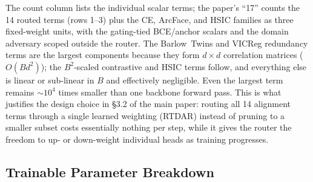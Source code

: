 The count column lists the individual scalar terms; the paper's ``17'' counts the 14 routed terms (rows 1--3) plus the CE, ArcFace, and HSIC families as three fixed-weight units, with the gating-tied BCE/anchor scalars and the domain adversary scoped outside the router.
The Barlow~Twins and VICReg redundancy terms are the largest components because they form $d{\times}d$ correlation matrices ($O(Bd^2)$); the $B^2$-scaled contrastive and HSIC terms follow, and everything else is linear or sub-linear in $B$ and effectively negligible.
Even the largest term remains ${\sim}10^{4}$ times smaller than one backbone forward pass.
This is what justifies the design choice in \S3.2 of the main paper: routing all 14 alignment terms through a single learned weighting (RTDAR) instead of pruning to a smaller subset costs essentially nothing per step, while it gives the router the freedom to up- or down-weight individual heads as training progresses.

\subsection{Trainable Parameter Breakdown}

\begin{table}[htbp]
\centering
\caption{Trainable parameter count per module. The 803K--805K total is $0.92\%$ of the frozen BLIP encoder.}
\label{tab:param_breakdown}
\end{table}


